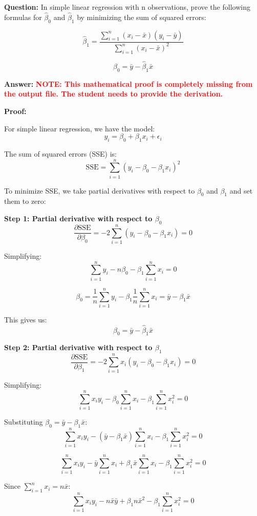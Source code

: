 \documentclass[11pt]{article}
\begin{document}
\textbf{Question:} In simple linear regression with n observations, prove the following formulas for $\hat{\beta}_0$ and $\hat{\beta}_1$ by minimizing the sum of squared errors:

\[
\hat{\beta}_1 = \frac{\sum_{i=1}^{n}(x_i - \bar{x})(y_i - \bar{y})}{\sum_{i=1}^{n}(x_i - \bar{x})^2}
\]

\[
\hat{\beta}_0 = \bar{y} - \hat{\beta}_1\bar{x}
\]

\textbf{Answer:} \textcolor{red}{\textbf{NOTE: This mathematical proof is completely missing from the output file. The student needs to provide the derivation.}}

\textbf{Proof:}

For simple linear regression, we have the model:
\[
y_i = \beta_0 + \beta_1 x_i + \epsilon_i
\]

The sum of squared errors (SSE) is:
\[
\text{SSE} = \sum_{i=1}^{n}(y_i - \beta_0 - \beta_1 x_i)^2
\]

To minimize SSE, we take partial derivatives with respect to $\beta_0$ and $\beta_1$ and set them to zero:

\textbf{Step 1: Partial derivative with respect to $\beta_0$}
\[
\frac{\partial \text{SSE}}{\partial \beta_0} = -2\sum_{i=1}^{n}(y_i - \beta_0 - \beta_1 x_i) = 0
\]

Simplifying:
\[
\sum_{i=1}^{n}y_i - n\beta_0 - \beta_1\sum_{i=1}^{n}x_i = 0
\]

\[
\beta_0 = \frac{1}{n}\sum_{i=1}^{n}y_i - \beta_1\frac{1}{n}\sum_{i=1}^{n}x_i = \bar{y} - \beta_1\bar{x}
\]

This gives us:
\[
\hat{\beta}_0 = \bar{y} - \hat{\beta}_1\bar{x}
\]

\textbf{Step 2: Partial derivative with respect to $\beta_1$}
\[
\frac{\partial \text{SSE}}{\partial \beta_1} = -2\sum_{i=1}^{n}x_i(y_i - \beta_0 - \beta_1 x_i) = 0
\]

Simplifying:
\[
\sum_{i=1}^{n}x_i y_i - \beta_0\sum_{i=1}^{n}x_i - \beta_1\sum_{i=1}^{n}x_i^2 = 0
\]

Substituting $\beta_0 = \bar{y} - \beta_1\bar{x}$:
\[
\sum_{i=1}^{n}x_i y_i - (\bar{y} - \beta_1\bar{x})\sum_{i=1}^{n}x_i - \beta_1\sum_{i=1}^{n}x_i^2 = 0
\]

\[
\sum_{i=1}^{n}x_i y_i - \bar{y}\sum_{i=1}^{n}x_i + \beta_1\bar{x}\sum_{i=1}^{n}x_i - \beta_1\sum_{i=1}^{n}x_i^2 = 0
\]

Since $\sum_{i=1}^{n}x_i = n\bar{x}$:
\[
\sum_{i=1}^{n}x_i y_i - n\bar{x}\bar{y} + \beta_1n\bar{x}^2 - \beta_1\sum_{i=1}^{n}x_i^2 = 0
\]
\end{document}
